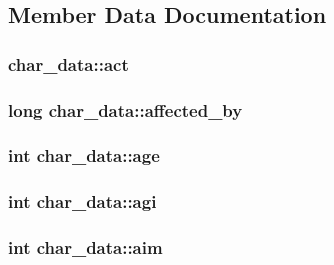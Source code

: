 \subsection{Member Data Documentation}
\hypertarget{structchar__data_a556de4fce697cbec20ab6d1c7af5325b}{
\subsubsection[{act}]{ char\-\_\-data\-::act}}\label{structchar__data_a556de4fce697cbec20ab6d1c7af5325b}
\hypertarget{structchar__data_a437961a6017b4d422ac7e7c314be5a18}{
\subsubsection[{affected\-\_\-by}]{\setlength{\rightskip}{0pt plus 5cm}long char\-\_\-data\-::affected\-\_\-by}}\label{structchar__data_a437961a6017b4d422ac7e7c314be5a18}
\hypertarget{structchar__data_a86b48ce2360461ba54f49a026382cbdd}{
\subsubsection[{age}]{\setlength{\rightskip}{0pt plus 5cm}int char\-\_\-data\-::age}}\label{structchar__data_a86b48ce2360461ba54f49a026382cbdd}
\hypertarget{structchar__data_a81ce16fafb43c9c3da25f08bafa45354}{
\subsubsection[{agi}]{\setlength{\rightskip}{0pt plus 5cm}int char\-\_\-data\-::agi}}\label{structchar__data_a81ce16fafb43c9c3da25f08bafa45354}
\hypertarget{structchar__data_abd65775c62e3fde71c70527bce24b1b5}{
\subsubsection[{aim}]{\setlength{\rightskip}{0pt plus 5cm}int char\-\_\-data\-::aim}}\label{structchar__data_abd65775c62e3fde71c70527bce24b1b5}
